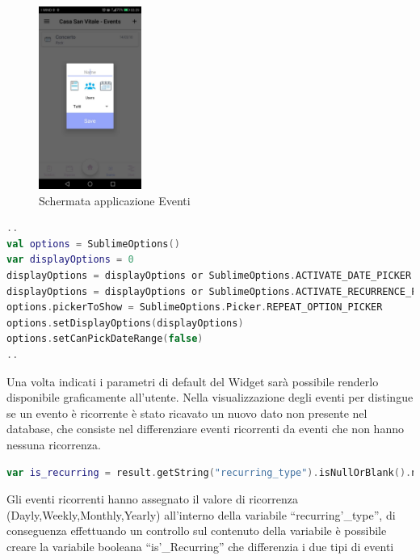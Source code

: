 \begin{figure}[!h]
  \centering
  \includegraphics[width=0.3\textwidth]{immagini/app_event.jpg}
  \caption{Schermata applicazione Eventi}\label{fig:Schermata applicazione Eventi}
\end{figure}

\begin{lstlisting}[language=kotlin,caption={Configurazione del Widget SublimePicker}]
..
val options = SublimeOptions()
var displayOptions = 0
displayOptions = displayOptions or SublimeOptions.ACTIVATE_DATE_PICKER
displayOptions = displayOptions or SublimeOptions.ACTIVATE_RECURRENCE_PICKER
options.pickerToShow = SublimeOptions.Picker.REPEAT_OPTION_PICKER
options.setDisplayOptions(displayOptions)
options.setCanPickDateRange(false)
..

\end{lstlisting}
Una volta indicati i parametri di default del Widget sarà possibile renderlo disponibile graficamente all'utente.
Nella visualizzazione degli eventi per distingue se un evento è ricorrente è stato ricavato un nuovo dato non presente nel database, che consiste nel differenziare eventi ricorrenti da eventi che non hanno nessuna ricorrenza.\\

\begin{lstlisting}[language=kotlin,caption={Linea di codice del modello Event}]
   var is_recurring = result.getString("recurring_type").isNullOrBlank().not()
\end{lstlisting}

Gli eventi ricorrenti hanno assegnato il valore di ricorrenza (Dayly,Weekly,Monthly,Yearly) all'interno della variabile ``recurring'\_type'', di conseguenza effettuando un controllo sul contenuto della variabile è possibile creare la variabile booleana ``is'\_Recurring'' che differenzia i due tipi di eventi

